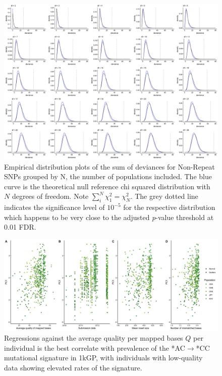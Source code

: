 \documentclass[9pt,lineno]{elife}
\begin{document}
\begin{figure}[h]
\includegraphics[width=\hsize,keepaspectratio]{./Figures/AllDeviances.jpg}

\caption{Empirical distribution plots of the sum of deviances for Non-Repeat SNPs grouped by N, the number of populations included. The blue curve is the theoretical null reference chi squared distribution with $N$ degrees of freedom. Note $\sum_i^N  \chi^2_1= \chi^2_N$. The grey dotted line indicates the significance level of $10^{-5}$ for the respective distribution which happens to be very close to the adjusted \textit{p}-value threshold at 0.01 FDR. }
\label{Deviances}
\end{figure}

\begin{figure}[h]
\includegraphics[width=\hsize,keepaspectratio]{./Figures/PC1_Correlation.jpg}
\caption{Regressions against the average quality per mapped bases $Q$ per individual is the best correlate with prevalence of the  *AC${\rightarrow}$*CC mutational signature in 1kGP, with individuals with low-quality data showing elevated rates of the signature.  }
\label{PC1_Correlation}
\end{figure}
\end{document}
